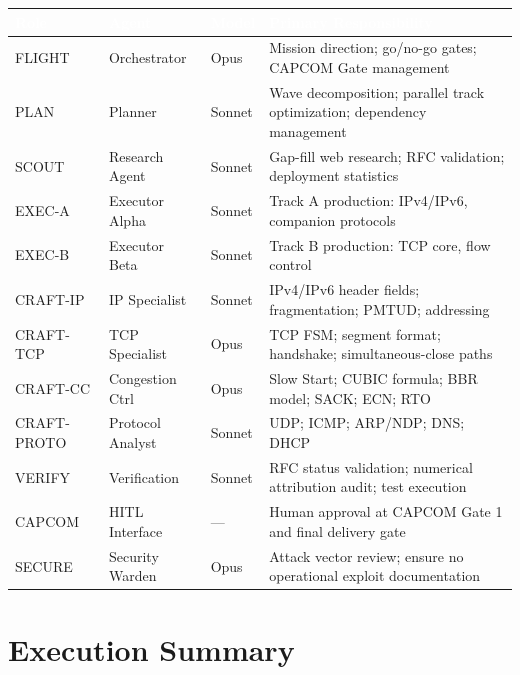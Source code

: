 \documentclass[11pt,letterpaper]{article}
\newcommand{\tableheader}[1]{\textbf{\sffamily\textcolor{white}{#1}}}
\begin{document}
\begin{center}
\begin{tabularx}{\textwidth}{L{2cm}L{2.5cm}L{2cm}X}
\toprule
{}
\tableheader{Role} & \tableheader{Agent} & \tableheader{Model} & \tableheader{Primary Responsibility} \\
\midrule
FLIGHT & Orchestrator & Opus & Mission direction; go/no-go gates; CAPCOM Gate management \\
PLAN & Planner & Sonnet & Wave decomposition; parallel track optimization; dependency management \\
SCOUT & Research Agent & Sonnet & Gap-fill web research; RFC validation; deployment statistics \\
EXEC-A & Executor Alpha & Sonnet & Track A production: IPv4/IPv6, companion protocols \\
EXEC-B & Executor Beta & Sonnet & Track B production: TCP core, flow control \\
CRAFT-IP & IP Specialist & Sonnet & IPv4/IPv6 header fields; fragmentation; PMTUD; addressing \\
CRAFT-TCP & TCP Specialist & Opus & TCP FSM; segment format; handshake; simultaneous-close paths \\
CRAFT-CC & Congestion Ctrl & Opus & Slow Start; CUBIC formula; BBR model; SACK; ECN; RTO \\
CRAFT-PROTO & Protocol Analyst & Sonnet & UDP; ICMP; ARP/NDP; DNS; DHCP \\
VERIFY & Verification & Sonnet & RFC status validation; numerical attribution audit; test execution \\
CAPCOM & HITL Interface & --- & Human approval at CAPCOM Gate 1 and final delivery gate \\
SECURE & Security Warden & Opus & Attack vector review; ensure no operational exploit documentation \\
\bottomrule
\end{tabularx}
\end{center}

\section{Execution Summary}
\end{document}
